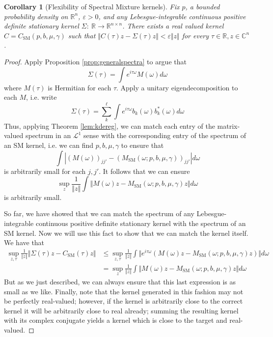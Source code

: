 \documentclass{article}
\newtheorem{coro}{Corollary}
\theoremstyle{definition}
\newcommand{\SM}{\mathrm{SM}}
\begin{document}
\begin{coro}[Flexibility of Spectral Mixture kernels] \label{cor:smflex}
Fix $p$, a bounded probability density on $\mathbb{R}^n$, $\varepsilon>0$, and any Lebesgue-integrable continuous positive definite stationary kernel $\Sigma:\ \mathbb{R} \rightarrow \mathbb{R}^{n\times n}$.   There exists a real valued kernel $C=C_\SM(p,b,\mu,\gamma)$ such that $\Vert C(\tau)z -\Sigma(\tau)z \Vert < \varepsilon \Vert z \Vert$ for every $\tau\in\mathbb{R},z\in\mathbb{C}^n$.  
\end{coro}
\begin{proof}
Apply Proposition \ref{prop:generalspectra} to argue that
\[
\Sigma(\tau) = \int e^{i \tau \omega} M(\omega) d\omega
\]
where $M(\tau)$ is Hermitian for each $\tau$.  Apply a unitary eigendecomposition to each $M$, i.e. write
\[
\Sigma(\tau) = \sum_{k}^\ell \int e^{i \tau \omega} b_k(\omega) b_k^*(\omega) d\omega
\]
Thus, applying Theorem \ref{lem:kdereg}, we can match each entry of the matrix-valued spectrum in an $\mathscr{L}^1$ sense with the corresponding entry of the spectrum of an SM kernel, i.e. we can find $p,b,\mu,\gamma$ to ensure that 
\[
\int |(M(\omega))_{j j'} - (M_\SM(\omega;p,b,\mu,\gamma))_{j j'}| d\omega
\]
is arbitrarily small for each $j,j'$.  It follows that we can ensure 
\[
\sup_z \frac{1}{\Vert z\Vert}\int \Vert M(\omega)z - M_\SM(\omega;p,b,\mu,\gamma)z\Vert d\omega
\]
is arbitrarily small.  

So far, we have showed that we can match the spectrum of any Lebesgue-integrable continuous positive definite stationary kernel with the spectrum of an SM kernel.  Now we will use this fact to show that we can match the kernel itself.  We have that
\begin{align*}
\sup_{z,\tau} \frac{1}{\Vert z\Vert} \Vert \Sigma(\tau)z - C_\SM(\tau)z \Vert 
  &\leq \sup_{z,\tau} \frac{1}{\Vert z\Vert}\int \Vert e^{i \tau \omega} (M(\omega)z - M_\SM(\omega;p,b,\mu,\gamma)z) \Vert d\omega\\
  &= \sup_{z} \frac{1}{\Vert z\Vert}\int \Vert M(\omega)z - M_\SM(\omega;p,b,\mu,\gamma)z \Vert d\omega
\end{align*}
But as we just described, we can always ensure that this last expression is as small as we like.   Finally, note that the kernel generated in this fashion may not be perfectly real-valued; however, if the kernel is arbitrarily close to the correct kernel it will be arbitrarily close to real already;  summing the resulting kernel with its complex conjugate yields a kernel which is close to the target and real-valued.
\end{proof}
\end{document}
